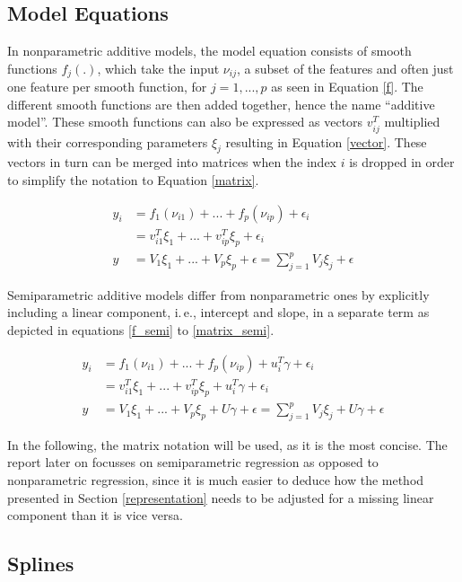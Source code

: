 \documentclass[12pt]{article}
\begin{document}
\subsection{Model Equations}

In nonparametric additive models, the model equation consists of smooth functions $f_j(.)$, which take the input $\nu_{ij}$, a subset of the features and often just one feature per smooth function, for $j = 1,...,p$ as seen in Equation \ref{f}. 
The different smooth functions are then added together, hence the name ``additive model''.
These smooth functions can also be expressed as vectors $v^T_{ij}$  multiplied with their corresponding parameters $\xi_j$ resulting in Equation \ref{vector}. These vectors in turn can be merged into matrices when the index $i$ is dropped in order to simplify the notation to Equation   \ref{matrix}.

\begin{align}
y_i &= f_1(\nu_{i1}) + ... + f_p(\nu_{ip})+\epsilon_i \label{f}\\
&=  v^T_{i1}\xi_1 + ... + v^T_{ip}\xi_p+\epsilon_i \label{vector} \\
y &= V_1\xi_1 + ... + V_p\xi_p +\epsilon= \sum_{j=1}^p V_j\xi_j +\epsilon \label{matrix}
\end{align}

Semiparametric additive models differ from nonparametric ones by explicitly including a linear component, i.\,e., intercept and slope, in a separate term as depicted in equations \ref{f_semi} to \ref{matrix_semi}.

\begin{align}
y_i &= f_1(\nu_{i1}) + ... + f_p(\nu_{ip})+ u^T_i\gamma+\epsilon_i\label{f_semi}\\
&=  v^T_{i1}\xi_1 + ... + v^T_{ip}\xi_p+ u^T_i\gamma+\epsilon_i\label{vector_semi} \\
y&= V_1\xi_1 + ... + V_p\xi_p + U\gamma +\epsilon= \sum_{j=1}^p V_j\xi_j + U\gamma+\epsilon\label{matrix_semi}
\end{align}

In the following, the matrix notation will be used, as it is the most concise.
The report later on focusses on semiparametric regression as opposed to nonparametric regression, since it is much easier to deduce how the method presented in Section \ref{representation} needs to be adjusted for a missing linear component than it is vice versa.

\subsection{Splines}
\end{document}
